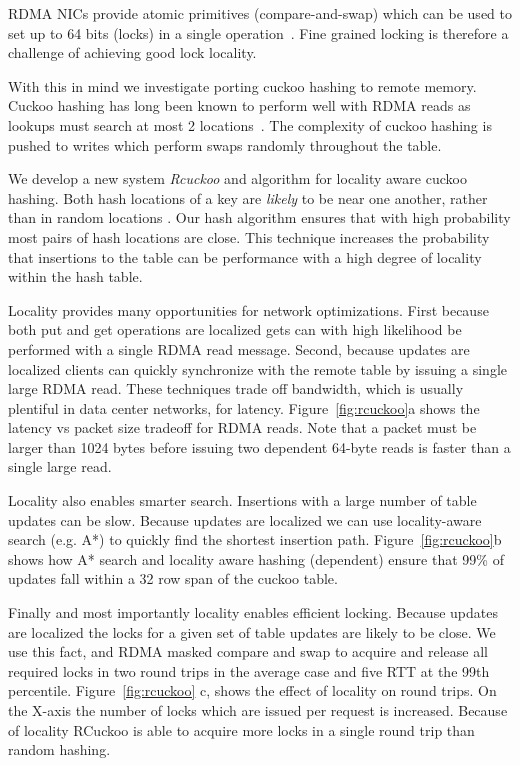 RDMA NICs provide atomic primitives (compare-and-swap) which
can be used to set up to 64 bits (locks) in a single
operation~\cite{melanox-operations}.  Fine grained locking
is therefore a challenge of achieving good lock locality.

With this in mind we investigate porting cuckoo hashing to
remote memory. Cuckoo hashing has long been known to perform
well with RDMA reads as lookups must search at most 2
locations~\cite{pilaf, farm}. The complexity of cuckoo
hashing is pushed to writes which perform swaps randomly
throughout the table. 


We develop a new system \textit{Rcuckoo} and algorithm for
locality aware cuckoo hashing. Both hash locations of a key
are \textit{likely} to be near one another, rather than in
random locations . Our hash algorithm ensures that with high
probability most pairs of hash locations are close.  This
technique increases the probability that insertions to the
table can be performance with a high degree of locality
within the hash table.

Locality provides many opportunities for network
optimizations. First because both put and get operations are
localized gets can with high likelihood be performed with a
single RDMA read message. Second, because updates are
localized clients can quickly synchronize with the remote
table by issuing a single large RDMA read. These techniques
trade off bandwidth, which is usually plentiful in data
center networks, for latency. Figure~\ref{fig:rcuckoo}a shows
the latency vs packet size tradeoff for RDMA reads. Note that
a packet must be larger than 1024 bytes before issuing two
dependent 64-byte reads is faster than a single large read.

Locality also enables smarter search. Insertions with a
large number of table updates can be slow. Because updates
are localized we can use locality-aware search (e.g. A*) to
quickly find the shortest insertion path.
Figure~\ref{fig:rcuckoo}b shows how A* search and locality
aware hashing (dependent) ensure that 99\% of updates fall
within a 32 row span of the cuckoo table.

Finally and most importantly locality enables efficient
locking. Because updates are localized the locks for a given
set of table updates are likely to be close. We use this
fact, and RDMA masked compare and swap  to
acquire and release all required locks in two round trips in
the average case and five RTT at the 99th percentile.
Figure~\ref{fig:rcuckoo} c, shows the effect of locality on
round trips. On the X-axis the number of locks which are
issued per request is increased. Because of locality RCuckoo
is able to acquire more locks in a single round trip than
random hashing.

